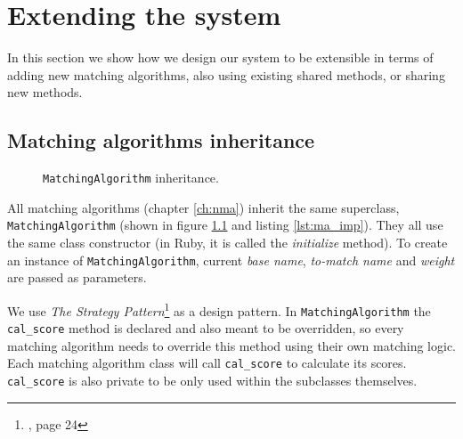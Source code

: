 \chapter{Extending the system}
\label{ch:extending}

In this section we show how we design our system to be extensible
in terms of adding new matching algorithms, also using existing
shared methods, or sharing new methods.

\section{Matching algorithms inheritance}

\begin{figure}[H]
\centering
\captionsetup{justification=centering}
\caption{\texttt{MatchingAlgorithm} inheritance.}
\label{fig:mai}
\end{figure}

All matching algorithms (chapter \ref{ch:nma}) inherit the same superclass,\\
\texttt{MatchingAlgorithm} (shown in figure \ref{fig:mai} and
listing \ref{lst:ma_imp}). They all use the same class constructor
(in Ruby, it is called the \emph{initialize} method). To create an instance
of \texttt{MatchingAlgorithm}, current \emph{base name}, \emph{to-match name}
and \emph{weight} are passed as parameters.

We use \emph{The Strategy Pattern}\footnote{\cite[]{hf}, page 24}
as a design pattern. In \texttt{MatchingAlgorithm} the \texttt{cal\_score} method
is declared and also meant to be overridden, so every matching
algorithm needs to override this method using their own matching logic.
Each matching algorithm class will call \texttt{cal\_score}
to calculate its scores.
\texttt{cal\_score} is also private to be only used within the subclasses
themselves.


